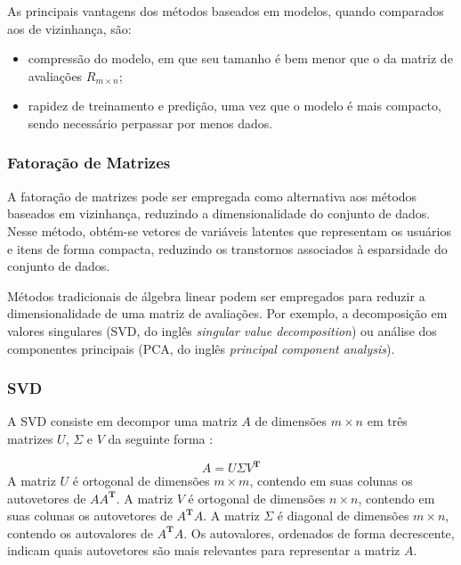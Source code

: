As principais vantagens dos métodos baseados em modelos, quando comparados aos de vizinhança, são:
\begin{itemize}
    \item compressão do modelo, em que seu tamanho é bem menor que o da matriz de avaliações $R_{m \times n}$;
    \item rapidez de treinamento e predição, uma vez que o modelo é mais compacto, sendo necessário perpassar por menos dados.
\end{itemize}

\subsubsection{Fatoração de Matrizes}
A fatoração de matrizes pode ser empregada como alternativa aos métodos baseados
em vizinhança, reduzindo a dimensionalidade do conjunto de dados. Nesse método,
obtém-se vetores de variáveis latentes que representam os usuários e itens de
forma compacta, reduzindo os transtornos associados à esparsidade do conjunto de
dados.

Métodos tradicionais de álgebra linear podem ser empregados para reduzir a
dimensionalidade de uma matriz de avaliações. Por exemplo, a decomposição em
valores singulares (SVD, do inglês \textit{singular value decomposition}) ou
análise dos componentes principais (PCA, do inglês \textit{principal component
analysis}).

\subsubsection{SVD}
A SVD consiste em decompor uma matriz $A$ de dimensões $m \times n$ em três
matrizes $U$, $\Sigma$ e $V$ da seguinte forma \cite{strang2006linear}:

\begin{equation}
    A = U \Sigma V^{\mathbf{T}}
    \label{eq:SVD}
\end{equation}
A matriz $U$ é ortogonal de dimensões $m \times m$, contendo em suas colunas
os autovetores de $AA^{\mathbf{T}}$. A matriz $V$ é ortogonal de dimensões $n
\times n$, contendo em suas colunas os autovetores de $A^{\mathbf{T}}A$. A
matriz $\Sigma$ é diagonal de dimensões $m \times n$, contendo os  autovalores
de $A^{\mathbf{T}}A$. Os autovalores, ordenados de forma decrescente, indicam
quais autovetores são mais relevantes para representar a matriz $A$.

